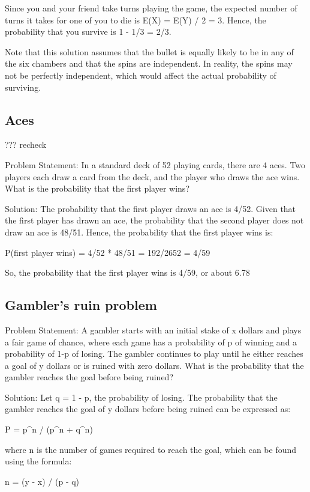\documentclass[12pt, a4paper, oneside]{article}
\begin{document}
Since you and your friend take turns playing the game, the expected number of turns it takes for one of you to die is E(X) = E(Y) / 2 = 3. Hence, the probability that you survive is 1 - 1/3 = 2/3.

Note that this solution assumes that the bullet is equally likely to be in any of the six chambers and that the spins are independent. In reality, the spins may not be perfectly independent, which would affect the actual probability of surviving.




\subsection{ Aces }

???
recheck


Problem Statement:
In a standard deck of 52 playing cards, there are 4 aces. Two players each draw a card from the deck, and the player who draws the ace wins. What is the probability that the first player wins?

Solution:
The probability that the first player draws an ace is 4/52. Given that the first player has drawn an ace, the probability that the second player does not draw an ace is 48/51. Hence, the probability that the first player wins is:

P(first player wins) = 4/52 * 48/51 = 192/2652 = 4/59

So, the probability that the first player wins is 4/59, or about 6.78%
\subsection{ Gambler’s ruin problem }
Problem Statement:
A gambler starts with an initial stake of x dollars and plays a fair game of chance, where each game has a probability of p of winning and a probability of 1-p of losing. The gambler continues to play until he either reaches a goal of y dollars or is ruined with zero dollars. What is the probability that the gambler reaches the goal before being ruined?

Solution:
Let q = 1 - p, the probability of losing. The probability that the gambler reaches the goal of y dollars before being ruined can be expressed as:

P = p^n / (p^n + q^n)

where n is the number of games required to reach the goal, which can be found using the formula:

n = (y - x) / (p - q)
\end{document}
